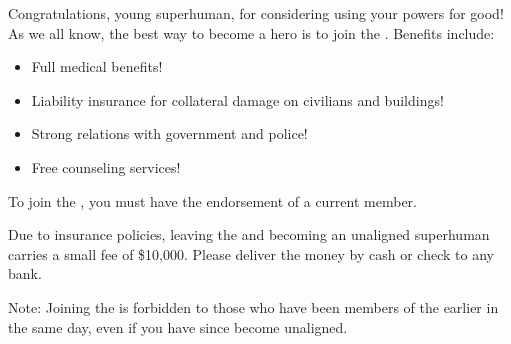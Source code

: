 \documentclass[white]{guildcamp1}
\begin{document}
\name{\wHeroRecruitment{}}

Congratulations, young superhuman, for considering using your powers for good!  As we all know, the best way to become a hero is to join the \cHeroLeague{\intro}.  Benefits include:

\begin{itemize}
\item Full medical benefits!
\item Liability insurance for collateral damage on civilians and buildings!
\item Strong relations with government and police!
\item Free counseling services!
\end{itemize}

To join the \cHeroLeague{}, you must have the endorsement of a current \cHeroLeague{} member.

Due to insurance policies, leaving the \cHeroLeague{} and becoming an unaligned superhuman carries a small fee of \$10,000.  Please deliver the money by cash or check to any bank.

Note: Joining the \cHeroLeague{} is forbidden to those who have been members of the \cVillainCompact{\intro} earlier in the same day, even if you have since become unaligned.
\end{document}
